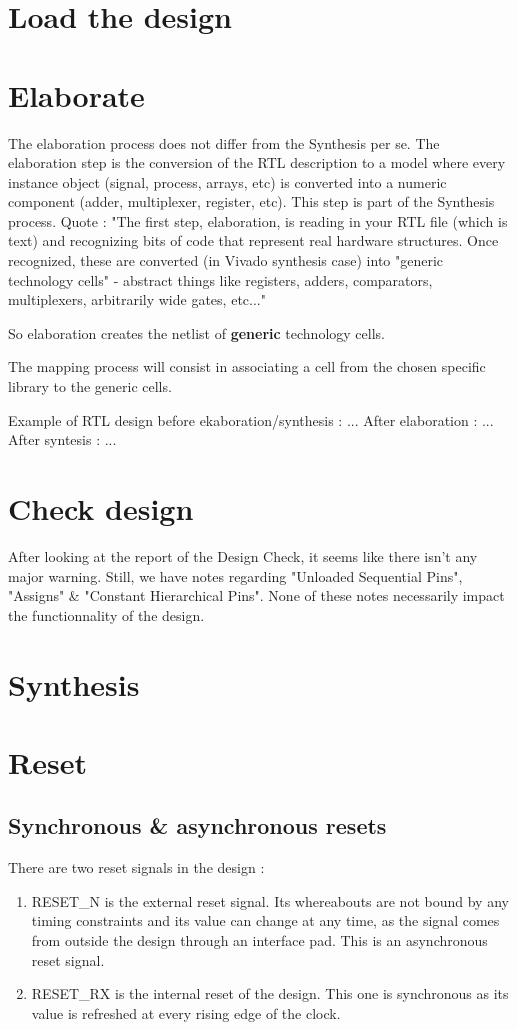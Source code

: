 \documentclass[a4paper]{article}
\begin{document}
\section{Load the design}

\section{Elaborate}

The elaboration process does not differ from the Synthesis per se. The elaboration step
is the conversion of the RTL description to a model where every instance object (signal,
process, arrays, etc) is converted into a numeric component (adder, multiplexer, register, etc).
This step is part of the Synthesis process.
Quote : "The first step, elaboration, is reading in your RTL file (which is text) and recognizing
bits of code that represent real hardware structures. Once recognized, these are converted (in
Vivado synthesis case) into "generic technology cells" - abstract things like registers, adders,
comparators, multiplexers, arbitrarily wide gates, etc..."

So elaboration creates the netlist of {\bf generic} technology cells.

The mapping process will consist in associating a cell from the chosen
specific library to the generic cells.

Example of RTL design before ekaboration/synthesis : ...
After elaboration : ...
After syntesis : ...

\section{Check design}

After looking at the report of the Design Check, it seems like there isn't any major warning. Still,
we have notes regarding "Unloaded Sequential Pins", "Assigns" \& "Constant Hierarchical Pins". None of
these notes necessarily impact the functionnality of the design.

\section{Synthesis}

\section{Reset}
\subsection{Synchronous \& asynchronous resets}
There are two reset signals in the design :
\begin{enumerate}
  \item RESET\_N is the external reset signal. Its whereabouts are not bound by any timing
  constraints and its value can change at any time, as the signal comes from outside the
  design through an interface pad. This is an asynchronous reset signal.
  \item RESET\_RX is the internal reset of the design. This one is synchronous as its
  value is refreshed at every rising edge of the clock.
\end{enumerate}
\end{document}
